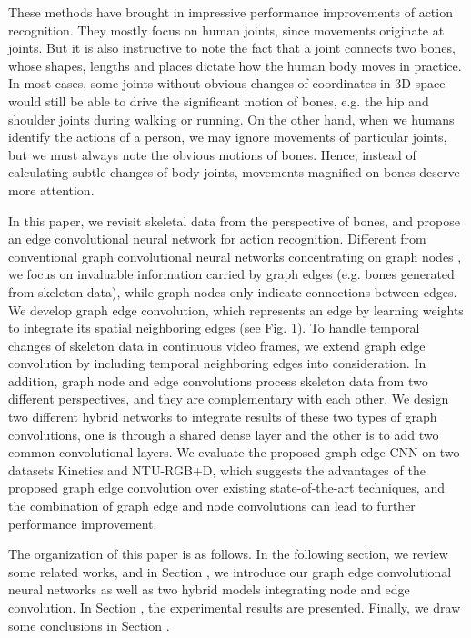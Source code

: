 \documentclass[a4paper,11pt]{article}
\begin{document}
These methods have brought in impressive performance improvements of action recognition. They mostly focus on human joints, since movements originate at joints. But it is also instructive to note the fact that a joint connects two bones, whose shapes, lengths and places dictate how the human body moves in practice. In most cases, some joints without obvious changes of coordinates in 3D space would still be able to drive the significant motion of bones, e.g. the hip and shoulder joints during walking or running. On the other hand, when we humans identify the actions of a person, we may ignore movements of particular joints, but we must always note the obvious motions of bones. Hence, instead of calculating subtle changes of body joints, movements magnified on bones deserve more attention.

In this paper, we revisit skeletal data from the perspective of bones, and propose an edge convolutional neural network for action recognition. Different from conventional graph convolutional neural networks concentrating on graph nodes \cite{ke2017new,soo2017interpretable,yan2018spatial}, we focus on invaluable information carried by graph edges (e.g. bones generated from skeleton data), while graph nodes only indicate connections between edges. 
We develop graph edge convolution, which represents an edge by learning weights to integrate its spatial neighboring edges (see Fig. 1). To handle temporal changes of skeleton data in continuous video frames, we extend graph edge convolution by including temporal neighboring edges into consideration. In addition, graph node and edge convolutions process skeleton data from two different perspectives, and they are complementary with each other. 
We design two different hybrid networks to integrate results of these two types of graph convolutions, one is through a shared dense layer and the other is to add two common convolutional layers. We evaluate the proposed graph edge CNN on two datasets Kinetics and NTU-RGB+D, which suggests the advantages of the proposed graph edge convolution over existing state-of-the-art techniques, and the combination of graph edge and node convolutions can lead to further performance improvement.

The organization of this paper is as follows. In the following section, we review some related works, and in Section \uppercase\expandafter{}, we introduce our graph edge convolutional neural networks as well as two hybrid models integrating node and edge convolution. In Section \uppercase\expandafter{}, the experimental results are presented. Finally, we draw some conclusions in Section \uppercase\expandafter{}.
\end{document}
